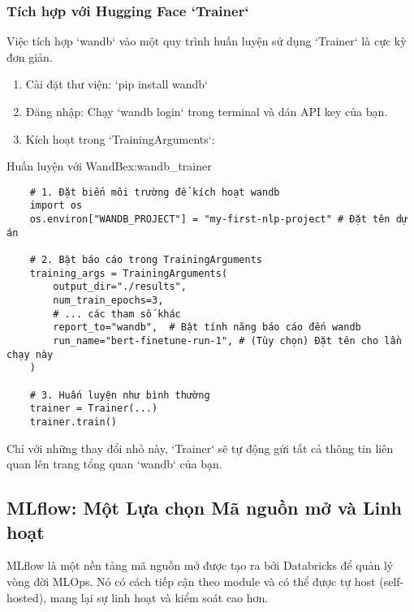 \subsubsection{Tích hợp với Hugging Face `Trainer`}
Việc tích hợp `wandb` vào một quy trình huấn luyện sử dụng `Trainer` là cực kỳ đơn giản.
\begin{enumerate}
    \item Cài đặt thư viện: `pip install wandb`
    \item Đăng nhập: Chạy `wandb login` trong terminal và dán API key của bạn.
    \item Kích hoạt trong `TrainingArguments`:
\end{enumerate}

\begin{example}{Huấn luyện với WandB}{ex:wandb_trainer}
    \begin{verbatim}
    # 1. Đặt biến môi trường để kích hoạt wandb
    import os
    os.environ["WANDB_PROJECT"] = "my-first-nlp-project" # Đặt tên dự án
    
    # 2. Bật báo cáo trong TrainingArguments
    training_args = TrainingArguments(
        output_dir="./results",
        num_train_epochs=3,
        # ... các tham số khác
        report_to="wandb",  # Bật tính năng báo cáo đến wandb
        run_name="bert-finetune-run-1", # (Tùy chọn) Đặt tên cho lần chạy này
    )
    
    # 3. Huấn luyện như bình thường
    trainer = Trainer(...)
    trainer.train()
    \end{verbatim}
\end{example}
Chỉ với những thay đổi nhỏ này, `Trainer` sẽ tự động gửi tất cả thông tin liên quan lên trang tổng quan `wandb` của bạn.

\subsection{MLflow: Một Lựa chọn Mã nguồn mở và Linh hoạt}
\label{ssec:mlflow}
MLflow là một nền tảng mã nguồn mở được tạo ra bởi Databricks để quản lý vòng đời MLOps. Nó có cách tiếp cận theo module và có thể được tự host (self-hosted), mang lại sự linh hoạt và kiểm soát cao hơn.

